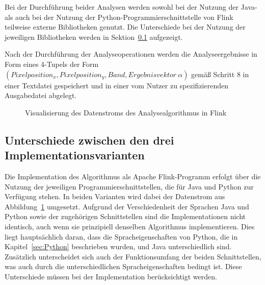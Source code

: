 Bei der Durchführung beider Analysen werden sowohl bei der Nutzung der Java- als auch bei der Nutzung der Python-Programmierschnittstelle von Flink teilweise externe Bibliotheken genutzt. Die Unterschiede bei der Nutzung der jeweiligen Bibliotheken werden in Sektion~\ref{sec:Differences} aufgezeigt. 

Nach der Durchführung der Analyseoperationen werden die Analyseergebnisse in Form eines 4-Tupels der Form $(Pixelposition_x, Pixelposition_y, Band, Ergebnisvektor\ \alpha)$ gemäß Schritt 8 in einer Textdatei gespeichert und in einer vom Nutzer zu spezifizierenden Ausgabedatei abgelegt.

\begin{figure}[h]
\centering

\caption{Visualisierung des Datenstroms des Analysealgorithmus in Flink} 
\label{fig:dataFlowAlgorithm}
\end{figure}


\subsection{Unterschiede zwischen den drei Implementationsvarianten}
\label{sec:Differences}
Die Implementation des Algorithmus als Apache Flink-Programm erfolgt über die Nutzung der jeweiligen Programmierschnittstellen, die für Java und Python zur Verfügung stehen. In beiden Varianten wird dabei der Datenstrom aus Abbildung~\ref{fig:dataFlowAlgorithm} umgesetzt. Aufgrund der Verschiedenheit der Sprachen Java und Python sowie der zugehörigen Schnittstellen sind die Implementationen nicht identisch, auch wenn sie prinzipiell denselben Algorithmus implementieren. Dies liegt hauptsächlich daran, dass die Spracheigenschaften von Python, die in Kapitel~\ref{sec:Python} beschrieben wurden, und Java unterschiedlich sind. Zusätzlich unterscheidet sich auch der Funktionsumfang der beiden Schnittstellen, was auch durch die unterschiedlichen Spracheigenschaften bedingt ist. Diese Unterschiede müssen bei der Implementation berücksichtigt werden. 

